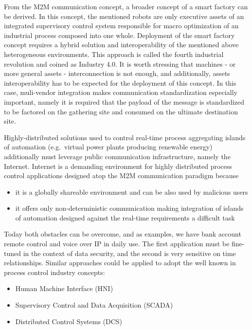 \documentclass{jacsart}
\providecommand{\tightlist} { \setlength{\itemsep}{0pt}\setlength{\parskip}{0pt}}
\begin{document}
From the M2M communication concept, a broader concept of a smart factory
can be derived. In this concept, the mentioned robots are only executive
assets of an integrated supervisory control system responsible for macro
optimization of an industrial process composed into one whole.
Deployment of the smart factory concept requires a hybrid solution and
interoperability of the mentioned above heterogeneous environments. This
approach is called the fourth industrial revolution and coined as
Industry 4.0. It is worth stressing that machines - or more general
assets - interconnection is not enough, and additionally, assets
interoperability has to be expected for the deployment of this concept.
In this case, muli-vendor integration makes communication
standardization especially important, namely it is required that the
payload of the message is standardized to be factored on the gathering
site and consumed on the ultimate destination site.

Highly-distributed solutions used to control real-time process
aggregating islands of automation (e.g.~virtual power plants producing
renewable energy) additionally must leverage public communication
infrastructure, namely the Internet. Internet is a demanding environment
for highly distributed process control applications designed atop the
M2M communication paradigm because

\begin{itemize}
\tightlist
\item
  it is a globally shareable environment and can be also used by
  malicious users
\item
  it offers only non-deterministic communication making integration of
  islands of automation designed against the real-time requirements a
  difficult task
\end{itemize}

Today both obstacles can be overcome, and as examples, we have bank
account remote control and voice over IP in daily use. The first
application must be fine-tuned in the context of data security, and the
second is very sensitive on time relationships. Similar approaches could
be applied to adopt the well known in process control industry concepts:

\begin{itemize}
\tightlist
\item
  Human Machine Interface (HNI)
\item
  Supervisory Control and Data Acquisition (SCADA)
\item
  Distributed Control Systems (DCS)
\end{itemize}
\end{document}
